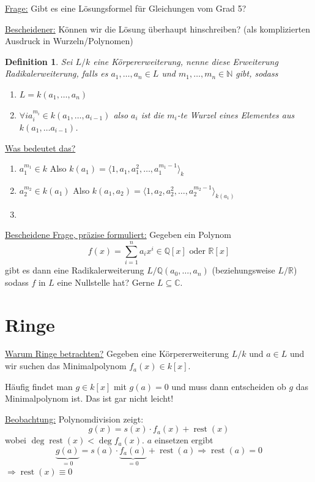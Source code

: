 \documentclass[a4paper,12pt,numbers=noenddot,parskip=full]{scrartcl}
\newcommand{\setN}{\mathbb{N}}
\newcommand{\setQ}{\mathbb{Q}}
\newcommand{\setR}{\mathbb{R}}
\newcommand{\setC}{\mathbb{C}}
\newcommand{\heading}{\underline}
\theoremstyle{dotless}
\newtheorem{definition}[theorem]{Definition}
\theoremstyle{remark}
\begin{document}
	\heading{Frage:} Gibt es eine Lösungsformel für Gleichungen vom Grad 5?
	
	\heading{Bescheidener:} Können wir die Lösung überhaupt hinschreiben? (als komplizierten Ausdruck in Wurzeln/Polynomen)
	
	\begin{definition}
		Sei $L/k$ eine Körpererweiterung, nenne diese Erweiterung Radikalerweiterung, falls es $a_1, \dots, a_n \in L$ und $m_1, \dots, m_n \in \setN$ gibt, sodass
		\begin{enumerate}
			\item $L = k(a_1, \dots, a_n)$
			\item $\forall i a_i^{m_i} \in k(a_1, \dots, a_{i-1})$ also $a_i$ ist die $m_i$-te Wurzel eines Elementes aus $k(a_1, \dots a_{i-1})$.
		\end{enumerate}
	\end{definition}

	\heading{Was bedeutet das?}
	\begin{enumerate}
		\item $a_1^{m_1} \in k$ Also $k(a_1) = \langle 1 , a_1, a_1^2, \dots, a_1^{m_1 - 1} \rangle_k$
		\item $a_2^{m_2} \in k(a_1)$ Also $k(a_1, a_2) = \langle 1 , a_2, a_2^2, \dots, a_2^{m_2 - 1} \rangle_{k(a_1)}$
		\item \textellipsis
	\end{enumerate}

	\heading{Bescheidene Frage, präzise formuliert:} Gegeben ein Polynom
	\begin{equation*}
		f(x) = \sum_{i=1}^{n} a_i x^i \in \setQ[x] \text{ oder } \setR[x]
	\end{equation*}
	gibt es dann eine Radikalerweiterung $L/\setQ(a_0, \dots, a_n)$ (beziehungsweise $L/\setR$) sodass $f$ in $L$ eine Nullstelle hat? Gerne $L \subseteq \setC$.
	
	\section{Ringe}
	
	\heading{Warum Ringe betrachten?} Gegeben eine Körpererweiterung $L/k$ und $a \in L$ und wir suchen das Minimalpolynom $f_a(x) \in k[x]$.
	
	Häufig findet man $g \in k[x]$ mit $g(a) = 0$ und muss dann entscheiden ob $g$ das Minimalpolynom ist. Das ist gar nicht leicht!
	
	\heading{Beobachtung:} Polynomdivision zeigt:
	\begin{equation*}
		g(x) = s(x) \cdot f_a(x) + \operatorname{rest}(x)
	\end{equation*}
	wobei $\deg \operatorname{rest}(x) < \deg f_a(x)$. $a$ einsetzen ergibt
	\begin{equation*}
		\underbrace{g(a)}_{= 0} = s(a) \cdot \underbrace{f_a(a)}_{=0} + \operatorname{rest}(a) \Rightarrow \operatorname{rest}(a) = 0
 	\end{equation*}
 	$\Rightarrow \operatorname{rest}(x) \equiv 0$
 	
\end{document}
